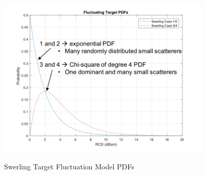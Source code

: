 \begin{figure}[H]
  \begin{center}
\includegraphics[width=4in]{../media/multistatic/swerling_pdfs.png}
  \end{center}
  \renewcommand{\baselinestretch}{1} \small\normalsize
  \begin{quote}
    \caption[Swerling Target Fluctuation Model PDFs]{Swerling Target Fluctuation Model PDFs\label{ms_fig:2}}
  \end{quote}
\end{figure}
\renewcommand{\baselinestretch}{2} \small\normalsize

